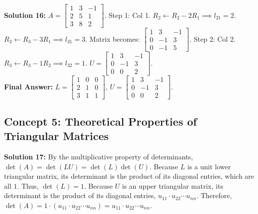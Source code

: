 \documentclass[11pt]{article}
\begin{document}
\vspace{0.5cm}
\textbf{Solution 16:}
$A = \begin{bmatrix} 1 & 3 & -1 \\ 2 & 5 & 1 \\ 3 & 8 & 2 \end{bmatrix}$.
Step 1: Col 1.
$R_2 \leftarrow R_2 - 2R_1 \implies l_{21} = 2$.
$R_3 \leftarrow R_3 - 3R_1 \implies l_{31} = 3$.
Matrix becomes: $\begin{bmatrix} 1 & 3 & -1 \\ 0 & -1 & 3 \\ 0 & -1 & 5 \end{bmatrix}$.
Step 2: Col 2.
$R_3 \leftarrow R_3 - 1R_2 \implies l_{32} = 1$.
$U = \begin{bmatrix} 1 & 3 & -1 \\ 0 & -1 & 3 \\ 0 & 0 & 2 \end{bmatrix}$. \\
\textbf{Final Answer:} $L = \begin{bmatrix} 1 & 0 & 0 \\ 2 & 1 & 0 \\ 3 & 1 & 1 \end{bmatrix}$, $U = \begin{bmatrix} 1 & 3 & -1 \\ 0 & -1 & 3 \\ 0 & 0 & 2 \end{bmatrix}$.

\subsection*{Concept 5: Theoretical Properties of Triangular Matrices}

\textbf{Solution 17:}
By the multiplicative property of determinants, $\det(A) = \det(LU) = \det(L)\det(U)$.
Because $L$ is a unit lower triangular matrix, its determinant is the product of its diagonal entries, which are all $1$. Thus, $\det(L) = 1$.
Because $U$ is an upper triangular matrix, its determinant is the product of its diagonal entries, $u_{11} \cdot u_{22} \cdots u_{nn}$.
Therefore, $\det(A) = 1 \cdot (u_{11} \cdot u_{22} \cdots u_{nn}) = u_{11} \cdot u_{22} \cdots u_{nn}$.
\end{document}
